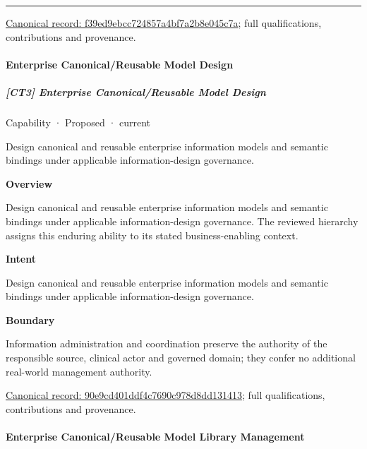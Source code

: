 \medskip\hrule\medskip

{\footnotesize \href{../../../../continuum/strategy/capability/f39ed9ebcc724857a4bf7a2b8e045c7a.md}{Canonical record: f39ed9ebcc724857a4bf7a2b8e045c7a}; full qualifications, contributions and provenance.}\par
\paragraph{Enterprise Canonical/Reusable Model Design}

\subparagraph{[CT3] Enterprise Canonical/Reusable Model Design}

\label{element:90e9cd401ddf4c7690c978d8dd131413}
{\small Capability · Proposed · current}\par

Design canonical and reusable enterprise information models and semantic bindings under applicable information-design governance.



\textbf{Overview}



Design canonical and reusable enterprise information models and semantic bindings under applicable information-design governance. The reviewed hierarchy assigns this enduring ability to its stated business-enabling context.



\textbf{Intent}



Design canonical and reusable enterprise information models and semantic bindings under applicable information-design governance.



\textbf{Boundary}



Information administration and coordination preserve the authority of the responsible source, clinical actor and governed domain; they confer no additional real-world management authority.


{\footnotesize \href{../../../../continuum/strategy/capability/90e9cd401ddf4c7690c978d8dd131413.md}{Canonical record: 90e9cd401ddf4c7690c978d8dd131413}; full qualifications, contributions and provenance.}\par
\paragraph{Enterprise Canonical/Reusable Model Library Management}

